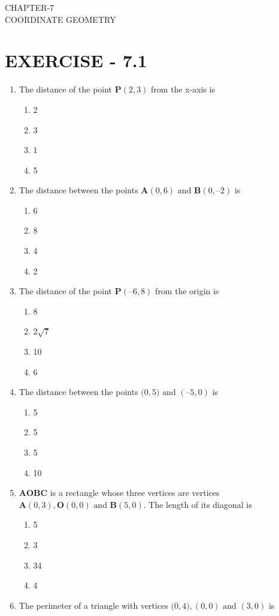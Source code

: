 \documentclass[12pt]{article}
\let\vec\mathbf
\begin{document}
\begin{center}
\textbf\large{CHAPTER-7 \\ COORDINATE GEOMETRY}
\end{center}

\section*{EXERCISE - 7.1}
\begin{enumerate}
	\item The distance of the point $\vec{P}(2, 3)$ from the x-axis is

\begin{enumerate}
\item 2
\item 3
\item 1
\item 5 
\end{enumerate}
\item The distance between the points $\vec{A}(0, 6) \text{ and } \vec{B}(0, –2)$ is
	\begin{enumerate}
\item 6
\item 8
\item 4	
\item 2
	\end{enumerate}
\item The distance of the point $\vec{P} (–6, 8)$ from the origin is
\begin{enumerate}

\item 8
\item 2$\sqrt{7}$ 
\item 10
\item 6
\end{enumerate}
\item The distance between the points $\vec(0, 5)\text{ and }(–5, 0)$ is
\begin{enumerate}

\item 5
\item 5
\item 5
\item 10
\end{enumerate}
\item $\vec{AOBC}$ is a rectangle whose three vertices are vertices $\vec{A} (0, 3), \vec{O}(0, 0)\text{ and }
	\vec{B} (5, 0)$. The length of its diagonal is
\begin{enumerate}
\item 5
\item3
\item 34
\item 4
\end{enumerate}
\item The perimeter of a triangle with vertices $\vec(0, 4), (0, 0) \text{ and } (3, 0)$ is
\begin{enumerate}


\end{enumerate}
\end{enumerate}
\end{document}
